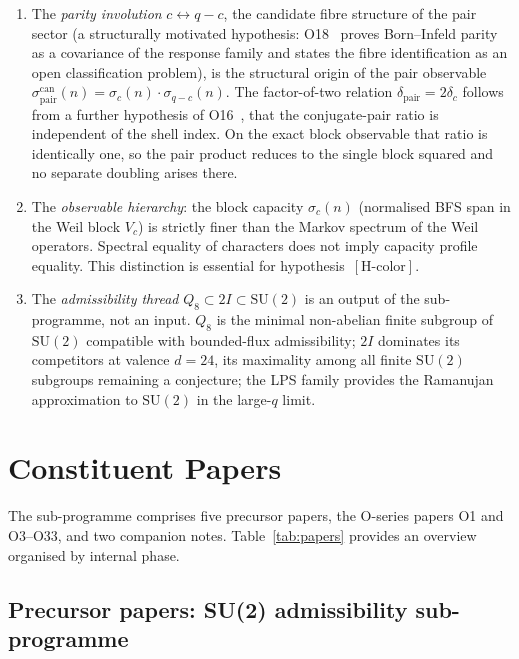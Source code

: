\documentclass[11pt,a4paper]{article}
\theoremstyle{definition}
\newcommand{\SU}{\mathrm{SU}}
\newcommand{\dimpair}{\delta_{\mathrm{pair}}}
\newcommand{\spair}{\sigma^{\mathrm{can}}_{\mathrm{pair}}}
\begin{document}
    \begin{enumerate}
      \item The \emph{parity involution} $c \leftrightarrow q - c$, the candidate fibre
      structure of the pair sector (a structurally motivated hypothesis: O18~\cite{Beau2026a22}
      proves Born--Infeld parity as a covariance of the response family and states the fibre identification
      as an open classification problem), is the structural origin of the pair observable
      $\spair(n) = \sigma_c(n) \cdot \sigma_{q-c}(n)$.
      The factor-of-two relation $\dimpair = 2\delta_c$ follows from a further hypothesis of
      O16~\cite{Beau2026a20}, that the conjugate-pair ratio is independent of the shell index.
      On the exact block observable that ratio is identically one, so the pair product reduces to
      the single block squared and no separate doubling arises there.

      \item The \emph{observable hierarchy}: the block capacity $\sigma_c(n)$ (normalised BFS
      span in the Weil block $V_c$) is strictly finer than the Markov spectrum of the Weil
      operators.
      Spectral equality of characters does not imply capacity profile equality.
      This distinction is essential for hypothesis~$[\mathrm{H\text{-}color}]$.

      \item The \emph{admissibility thread} $Q_8 \subset 2I \subset \SU(2)$ is an output of
      the sub-programme, not an input.
      $Q_8$ is the minimal non-abelian finite subgroup of $\SU(2)$ compatible with bounded-flux
      admissibility; $2I$ dominates its competitors at valence $d = 24$, its maximality among all
      finite $\SU(2)$ subgroups remaining a conjecture; the LPS family provides the Ramanujan
      approximation to $\SU(2)$ in the large-$q$ limit.
    \end{enumerate}

  \section{Constituent Papers}
    \label{sec:papers}

    The sub-programme comprises five precursor papers, the O-series papers O1 and O3--O33, and two
    companion notes.
    Table~\ref{tab:papers} provides an overview organised by internal phase.

    \subsection{Precursor papers: SU(2) admissibility sub-programme}
      \label{sec:precursor}
\end{document}
